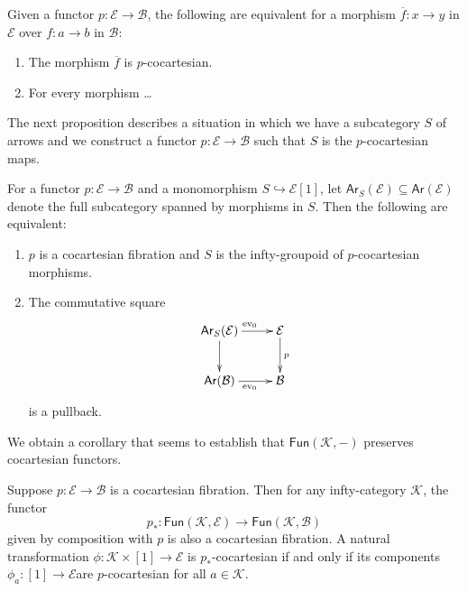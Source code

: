 \begin{lemma}
\label{lemma-p-cocartesian-characterization}
Given a functor
$p:\mathcal{E}\to\mathcal{B}$,
the following are equivalent for a morphism
$\overline{f}:x\to y$ in $\mathcal{E}$
over $f:a \to b$ in $\mathcal{B}$:
\begin{enumerate}
\item The morphism $\overline{f}$ is
$p$-cocartesian.
\item For every morphism  …
\end{enumerate}
\end{lemma}

\noindent
The next proposition describes a situation
in which we have a subcategory $S$ of arrows
and we construct a functor $p:\mathcal{E} \to
\mathcal{B}$
such that $S$ is the $p$-cocartesian maps.

\begin{proposition}
\label{proposition-subcategory-of-arrows}
For a functor $p:\mathcal{E} \to \mathcal{B}$
and a monomorphism
$S\hookrightarrow \mathcal{E}[1]$, let
$\mathsf{Ar}_S(\mathcal{E})\subseteq
\mathsf{Ar}(\mathcal{E})$
denote the full subcategory spanned by
morphisms in $S$.
Then the following are equivalent:
\begin{enumerate}
\item $p$ is a cocartesian fibration and  $S$
is the
infty-groupoid of $p$-cocartesian
morphisms.
\item The commutative square
$$
\xymatrix{
\mathsf{Ar}_S(\mathcal{E})\ar[r]^{\text{ev}
_0}\ar[d]&\mathcal{E}\ar[d]^{p}\\
\mathsf{Ar}(\mathcal{B})\ar[r]_{\text{ev}_0}&
\mathcal{B}
}
$$
is a pullback.
\end{enumerate}
\end{proposition}

We obtain a corollary that seems to establish
that $\mathsf{Fun}(\mathcal{K},-)$ preserves
cocartesian functors.

\begin{corollary}
\label{lemma-covar-fun-prese-cocar}
Suppose $p:\mathcal{E}\to \mathcal{B}$ is a
cocartesian fibration.
Then for any infty-category $\mathcal{K}$,
the functor
$$
p_*:\mathsf{Fun}(\mathcal{K},\mathcal{E})
\to\mathsf{Fun}(\mathcal{K},\mathcal{B})
$$
given by composition with $p$ is also a
cocartesian fibration.
A natural transformation
$\phi:\mathcal{K}\times[1]\to\mathcal{E}$
is $p_*$-cocartesian if and only if its
components
$\phi_a:[1]\to\mathcal{E}$are $p$-cocartesian
for all $a \in \mathcal{K}$.
\end{corollary}

